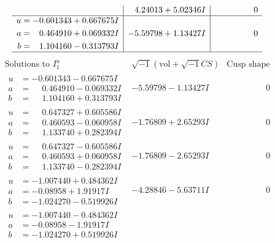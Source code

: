 \documentclass[1p]{elsarticle_modified}
\theoremstyle{definition}
\newcommand{\I}{\sqrt{-1}}
\begin{document}
$$\begin{array}{c|c|c}
 & \phantom{-}4.24013 + 5.02346 I & \phantom{-0.000000 } 0 \\ \hline\begin{aligned}
u &= -0.601343 + 0.667675 I \\
a &= \phantom{-}0.464910 + 0.069332 I \\
b &= \phantom{-}1.104160 - 0.313793 I\end{aligned}
 & -5.59798 + 1.13427 I & \phantom{-0.000000 } 0\\
 \hline 
 \end{array}$$\newpage$$\begin{array}{c|c|c}  
\text{Solutions to }I^u_{1}& \I (\text{vol} + \sqrt{-1}CS) & \text{Cusp shape}\\
 \hline 
\begin{aligned}
u &= -0.601343 - 0.667675 I \\
a &= \phantom{-}0.464910 - 0.069332 I \\
b &= \phantom{-}1.104160 + 0.313793 I\end{aligned}
 & -5.59798 - 1.13427 I & \phantom{-0.000000 } 0 \\ \hline\begin{aligned}
u &= \phantom{-}0.647327 + 0.605586 I \\
a &= \phantom{-}0.460593 - 0.060958 I \\
b &= \phantom{-}1.133740 + 0.282394 I\end{aligned}
 & -1.76809 + 2.65293 I & \phantom{-0.000000 } 0 \\ \hline\begin{aligned}
u &= \phantom{-}0.647327 - 0.605586 I \\
a &= \phantom{-}0.460593 + 0.060958 I \\
b &= \phantom{-}1.133740 - 0.282394 I\end{aligned}
 & -1.76809 - 2.65293 I & \phantom{-0.000000 } 0 \\ \hline\begin{aligned}
u &= -1.007440 + 0.484362 I \\
a &= -0.08958 + 1.91917 I \\
b &= -1.024270 - 0.519926 I\end{aligned}
 & -4.28846 - 5.63711 I & \phantom{-0.000000 } 0 \\ \hline\begin{aligned}
u &= -1.007440 - 0.484362 I \\
a &= -0.08958 - 1.91917 I \\
b &= -1.024270 + 0.519926 I\end{aligned}

\end{array}$$
\end{document}
